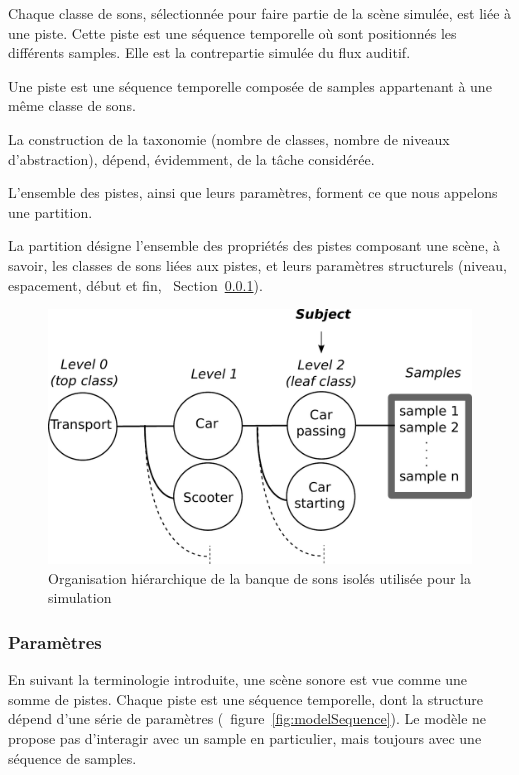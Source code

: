 Chaque classe de sons, sélectionnée pour faire partie de la scène simulée, est liée à une piste. Cette piste est une séquence temporelle où sont positionnés les différents samples. Elle est la contrepartie simulée du flux auditif.

\begin{mydef}
Une piste est une séquence temporelle composée de samples appartenant à une même classe de sons.
\end{mydef}

La construction de la taxonomie (nombre de classes, nombre de niveaux d'abstraction), dépend, évidemment, de la tâche considérée. 

L'ensemble des pistes, ainsi que leurs paramètres, forment ce que nous appelons une partition.

\begin{mydef}
La partition désigne l'ensemble des propriétés des pistes composant une scène, à savoir, les classes de sons liées aux pistes, et leurs paramètres structurels (niveau, espacement, début et fin, \cf~Section~\ref{sec:ch4_modelParam}).
\end{mydef}

\begin{figure}[t]
        \myfloatalign
        \includegraphics[width=.8\linewidth]{gfx/3}
       \caption{Organisation hiérarchique de la banque de sons isolés utilisée pour la simulation}\label{fig:orgDb}
\end{figure}

\subsubsection{Paramètres}
\label{sec:ch4_modelParam}

En suivant la terminologie   introduite, une scène sonore est vue comme une somme de pistes. Chaque piste est une séquence temporelle, dont la structure dépend d'une série de paramètres (\cf~figure~\ref{fig:modelSequence}). Le modèle ne propose pas d’interagir avec un sample en particulier, mais toujours avec une séquence de samples.

